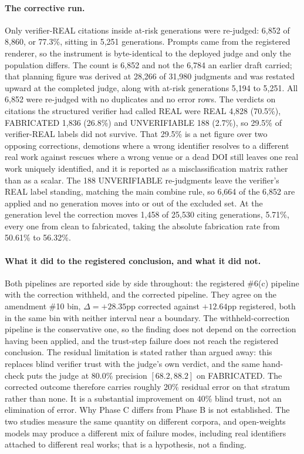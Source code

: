 \paragraph{The corrective run.}
Only verifier-REAL citations inside at-risk generations were re-judged: 6,852 of
8,860, or 77.3\%, sitting in 5,251 generations. Prompts came from the registered
renderer, so the instrument is byte-identical to the deployed judge and only the
population differs. The count is 6,852 and not the 6,784 an earlier draft
carried; that planning figure was derived at 28,266 of 31,980 judgments and was
restated upward at the completed judge, along with at-risk generations
5,194 to 5,251. All 6,852 were re-judged with no duplicates and no error rows.
The verdicts on citations the structured verifier had called REAL were REAL
4,828 (70.5\%), FABRICATED 1,836 (26.8\%) and UNVERIFIABLE 188 (2.7\%), so
29.5\% of verifier-REAL labels did not survive. That 29.5\% is a net figure over
two opposing corrections, demotions where a wrong identifier resolves to a
different real work against rescues where a wrong venue or a dead DOI still
leaves one real work uniquely identified, and it is reported as a
misclassification matrix rather than as a scalar. The 188 UNVERIFIABLE
re-judgments leave the verifier's REAL label standing, matching the main combine
rule, so 6,664 of the 6,852 are applied and no generation moves into or out of
the excluded set. At the generation level the correction moves 1,458 of 25,530
citing generations, 5.71\%, every one from clean to fabricated, taking the
absolute fabrication rate from 50.61\% to 56.32\%.

\paragraph{What it did to the registered conclusion, and what it did not.}
Both pipelines are reported side by side throughout: the registered \#6(c)
pipeline with the correction withheld, and the corrected pipeline. They agree on
the amendment \#10 bin, $\Delta = +28.35$pp corrected against $+12.64$pp
registered, both in the same bin with neither interval near a boundary. The
withheld-correction pipeline is the conservative one, so the finding does not
depend on the correction having been applied, and the trust-step failure does
not reach the registered conclusion. The residual limitation is stated rather
than argued away: this replaces blind verifier trust with the judge's own
verdict, and the same hand-check puts the judge at 80.0\% precision
$[68.2, 88.2]$ on FABRICATED. The corrected outcome therefore carries roughly
20\% residual error on that stratum rather than none. It is a substantial
improvement on 40\% blind trust, not an elimination of error. Why Phase C
differs from Phase B is not established. The two studies measure the same
quantity on different corpora, and open-weights models may produce a different
mix of failure modes, including real identifiers attached to different real
works; that is a hypothesis, not a finding.

